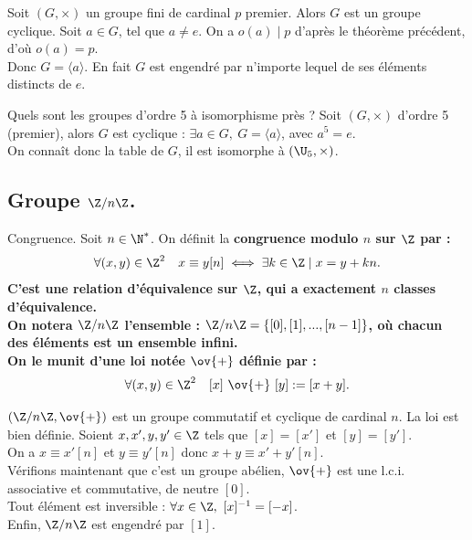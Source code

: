 \documentclass[11pt]{article}
\begin{document}
\vspace*{-0.8cm}

\begin{ex}{}{}
    Soit $(G,\times)$ un groupe fini de cardinal $p$ premier. Alors $G$ est un groupe cyclique.
    \tcblower
    Soit $a\in G$, tel que $a\neq e$. On a $o(a)\mid p$ d'après le théorème précédent, d'où $o(a)=p$.\\
    Donc $G=\langle a \rangle$. En fait $G$ est engendré par n'importe lequel de ses éléments distincts de $e$.
\end{ex}

\vspace*{-0.8cm}

\begin{ex}{}{}
    Quels sont les groupes d'ordre 5 à isomorphisme près ?
    \tcblower
    Soit $(G,\times)$ d'ordre 5 (premier), alors $G$ est cyclique : $\exists a \in G, ~ G=\langle a \rangle$, avec $a^5=e$.\\
    On connaît donc la table de $G$, il est isomorphe à $(\U_5,\times)$.
\end{ex}

\vspace*{-0.8cm}

\subsection{Groupe \texorpdfstring{$\Z/n\Z$}{Lg}.}

\begin{defi}{Congruence.}{}
    Soit $n\in\N^*$. On définit la \bf{congruence} modulo $n$ sur $\Z$ par :
    \begin{equation*}
        \forall (x,y)\in\Z^2 \quad x \equiv y[n] \iff \exists k \in \Z \mid x=y+kn.
    \end{equation*}
    C'est une relation d'équivalence sur $\Z$, qui a exactement $n$ classes d'équivalence.\\
    On notera $\Z/n\Z$ l'ensemble : $\Z/n\Z=\{[0],[1],...,[n-1]\}$, où chacun des éléments est un ensemble infini.\\
    On le munit d'une loi notée $\ov{+}$ définie par :
    \begin{equation*}
        \forall (x,y) \in \Z^2 \quad [x]~\ov{+}~[y]:=[x+y].
    \end{equation*}
\end{defi}

\vspace*{0.2cm}

\begin{prop}{}{}
    $(\Z/n\Z,\ov{+})$ est un groupe commutatif et cyclique de cardinal $n$.
    \tcblower
    La loi est bien définie. Soient $x,x',y,y'\in\Z$ tels que $[x]=[x']$ et $[y]=[y']$.\\
    On a $x\equiv x'[n]$ et $y\equiv y'[n]$ donc $x+y\equiv x'+y'[n]$.\\
    Vérifions maintenant que c'est un groupe abélien, $\ov{+}$ est une l.c.i. associative et commutative, de neutre $[0]$.\\
    Tout élément est inversible : $\forall x \in \Z, ~ [x]^{-1}=[-x]$.\\
    Enfin, $\Z/n\Z$ est engendré par $[1]$.
\end{prop}
\end{document}
